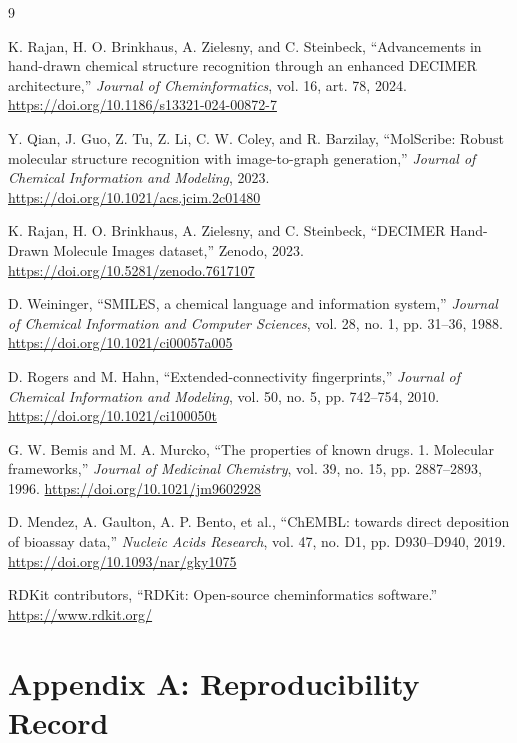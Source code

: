 \documentclass[11pt,a4paper]{article}
\begin{document}
\begin{thebibliography}{9}

K. Rajan, H. O. Brinkhaus, A. Zielesny, and C. Steinbeck,
``Advancements in hand-drawn chemical structure recognition through an enhanced DECIMER architecture,''
\emph{Journal of Cheminformatics}, vol. 16, art. 78, 2024.
\url{https://doi.org/10.1186/s13321-024-00872-7}

Y. Qian, J. Guo, Z. Tu, Z. Li, C. W. Coley, and R. Barzilay,
``MolScribe: Robust molecular structure recognition with image-to-graph generation,''
\emph{Journal of Chemical Information and Modeling}, 2023.
\url{https://doi.org/10.1021/acs.jcim.2c01480}

K. Rajan, H. O. Brinkhaus, A. Zielesny, and C. Steinbeck,
``DECIMER Hand-Drawn Molecule Images dataset,'' Zenodo, 2023.
\url{https://doi.org/10.5281/zenodo.7617107}

D. Weininger, ``SMILES, a chemical language and information system,''
\emph{Journal of Chemical Information and Computer Sciences}, vol. 28, no. 1, pp. 31--36, 1988.
\url{https://doi.org/10.1021/ci00057a005}

D. Rogers and M. Hahn, ``Extended-connectivity fingerprints,''
\emph{Journal of Chemical Information and Modeling}, vol. 50, no. 5, pp. 742--754, 2010.
\url{https://doi.org/10.1021/ci100050t}

G. W. Bemis and M. A. Murcko, ``The properties of known drugs. 1. Molecular frameworks,''
\emph{Journal of Medicinal Chemistry}, vol. 39, no. 15, pp. 2887--2893, 1996.
\url{https://doi.org/10.1021/jm9602928}

D. Mendez, A. Gaulton, A. P. Bento, et al., ``ChEMBL: towards direct deposition of bioassay data,''
\emph{Nucleic Acids Research}, vol. 47, no. D1, pp. D930--D940, 2019.
\url{https://doi.org/10.1093/nar/gky1075}

RDKit contributors, ``RDKit: Open-source cheminformatics software.''
\url{https://www.rdkit.org/}

\end{thebibliography}

\section*{Appendix A: Reproducibility Record}
\label{app:reproducibility}
\end{document}
